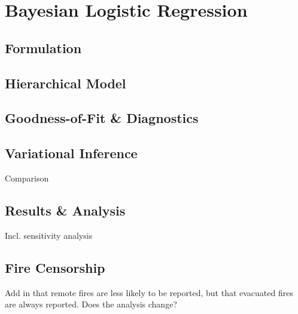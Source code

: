 \section{Bayesian Logistic Regression}\label{sec:bayesian_logistic_regression}
\subsection{Formulation}\label{sec:formulation}
\subsection{Hierarchical Model}
\subsection{Goodness-of-Fit \& Diagnostics}
\subsection{Variational Inference}
Comparison
\subsection{Results \& Analysis}
Incl. sensitivity analysis
\subsection{Fire Censorship}
Add in that remote fires are less likely to be reported, but that evacuated fires are always reported. Does the analysis change?

